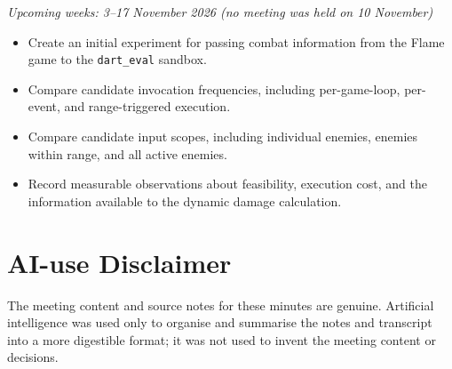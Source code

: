 \documentclass[12pt,a4paper]{article}
\begin{document}
\noindent\textit{Upcoming weeks: 3--17 November 2026 (no meeting was held on 10 November)}
\begin{itemize}[leftmargin=*]
    \item Create an initial experiment for passing combat information from the
    Flame game to the \texttt{dart\_eval} sandbox.
    \item Compare candidate invocation frequencies, including per-game-loop,
    per-event, and range-triggered execution.
    \item Compare candidate input scopes, including individual enemies,
    enemies within range, and all active enemies.
    \item Record measurable observations about feasibility, execution cost,
    and the information available to the dynamic damage calculation.
\end{itemize}

\section*{\small AI-use Disclaimer}
\small The meeting content and source notes for these minutes are genuine.
Artificial intelligence was used only to organise and summarise the notes
and transcript into a more digestible format; it was not used to invent the
meeting content or decisions.
\end{document}
